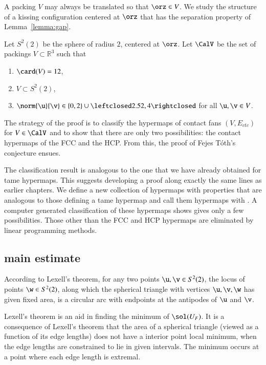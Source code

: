 \documentclass{llncs}
\newcommand{\ring}[1]{\mathbb{#1}}
\begin{document}
A packing $V$ may always be translated so that $\orz\in V$.  We study
the structure of a kissing configuration centered at $\orz$ that
has the separation property of Lemma~\ref{lemma:gap}.

\begin{definition}[$S^2(2)$,~$\CalV$]
  Let $S^2(2)$ be the sphere of radius $2$, centered at $\orz$.  Let
  $\CalV$ be the set of packings $V\subset \ring{R}^3$ such that
\begin{enumerate}\wasitemize 
\item $\card(V) = 12$,
\item $V\subset S^2(2)$,
\item $\norm{\u}{\v} \in \{0,2\}\cup
  \leftclosed2.52,4\rightclosed$ for all $\u,\v\in V$.
\end{enumerate}\wasitemize 
{}%
%
\end{definition}

The strategy of the proof is to classify the hypermaps of contact
fans $(V,E_{ctc})$ for $V\in \CalV$ and to show that there are only two
possibilities: the contact hypermaps of the FCC and the HCP.  From
this, the proof of Fejes T\'oth's conjecture ensues.

The classification result is analogous to the one that we have already
obtained for tame hypermaps.  This suggests developing a proof along
exactly the same lines as earlier chapters.  We define a new
collection of hypermaps with properties that are analogous to those
defining a tame hypermap and call them hypermaps with 
.  A computer generated classification of these hypermaps
shows gives only a few possibilities.  Those other than the FCC and
HCP hypermaps are eliminated by linear programming methods.

\subsection{main estimate}




\begin{remark}
According to Lexell's theorem, for any two points $\u,\v\in S^2(2)$,
the locus of points $\w\in S^2(2)$, along which
the spherical triangle with vertices $\u,\v,\w$ has given fixed area, is a circular arc
with endpoints at the antipodes of $\u$ and $\v$.



Lexell's theorem is an aid in finding the minimum of
  $\sol(U_F)$.
  It is a consequence of Lexell's theorem that the area of a spherical
  triangle (viewed as a function of its edge lengths) does not have a
  interior point local minimum, when the edge lengths are
  constrained to lie in given intervals.  The minimum occurs at a
  point where each edge length is extremal.
%
%
\end{remark}
\end{document}
